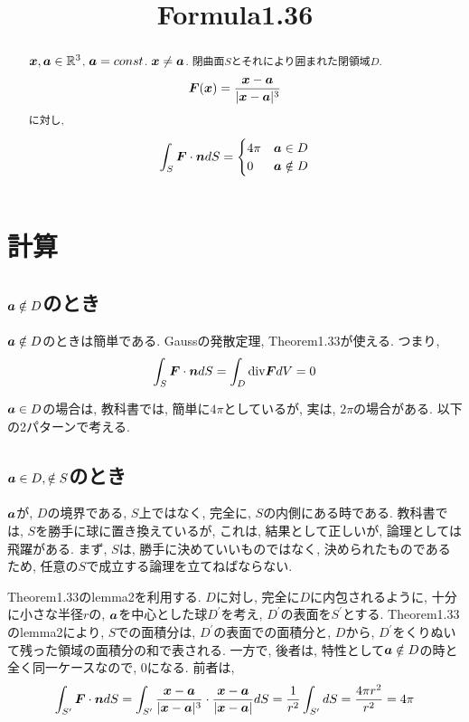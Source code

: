 \documentclass{jsarticle}
\title{Formula1.36}
\newcommand*{\mbold}[1]{\mbox{\boldmath $#1$}}
\newcommand*{\divg}{{\rm div}}
\begin{document}
\maketitle

\begin{abstract}
  $\mbold{x}, \mbold{a} \in \mathbb{R}^3$, $\mbold{a} = const$. $\mbold{x} \neq \mbold{a}$.
  閉曲面$S$とそれにより囲まれた閉領域$D$.
  \begin{equation*}
    \mbold{F}(\mbold{x}) = \frac{\mbold{x} - \mbold{a}}{|\mbold{x} - \mbold{a}|^3}
  \end{equation*}
  に対し, 
  
  \begin{equation}
    \int_S \mbold{F}\cdot\mbold{n}dS = 
    \begin{cases}
      4\pi & \mbold{a} \in D \\
      0    & \mbold{a} \notin D 
    \end{cases}
  \end{equation}


\end{abstract}

\section*{計算}
\subsection{$\mbold{a} \notin D$のとき}
$\mbold{a} \notin D$のときは簡単である. 
Gaussの発散定理, Theorem1.33が使える. つまり, 
\begin{equation}
  \int_S \mbold{F}\cdot\mbold{n}dS = \int_D \divg \mbold{F} dV = 0
\end{equation}

$\mbold{a} \in D$の場合は, 教科書では, 簡単に$4\pi$としているが, 
実は, $2\pi$の場合がある. 
以下の2パターンで考える. 

\subsection{$\mbold{a} \in D, \notin S$のとき}
$\mbold{a}$が, $D$の境界である, $S$上ではなく, 完全に, $S$の内側にある時である. 
教科書では, $S$を勝手に球に置き換えているが, これは, 結果として正しいが, 論理としては飛躍がある. 
まず, $S$は, 勝手に決めていいものではなく, 決められたものであるため, 任意の$S$で成立する論理を立てねばならない. 

Theorem1.33のlemma2を利用する. $D$に対し, 完全に$D$に内包されるように, 十分に小さな半径$r$の, $\mbold{a}$を中心とした球$D^\prime$を考え, 
$D^\prime$の表面を$S^\prime$とする. 
Theorem1.33のlemma2により, $S$での面積分は, $D^\prime$の表面での面積分と, $D$から, $D^\prime$をくりぬいて残った領域の面積分の和で表される. 
一方で, 後者は, 特性として$\mbold{a} \notin D$の時と全く同一ケースなので, $0$になる. 
前者は, 
\begin{equation}
  \int_{S^\prime} \mbold{F}\cdot \mbold{n}dS
  = \int_{S^\prime} \frac{\mbold{x} - \mbold{a}}{|\mbold{x} - \mbold{a}|^3} \cdot \frac{\mbold{x} - \mbold{a}}{|\mbold{x} - \mbold{a}|}dS 
  = \frac{1}{r^2}\int_{S^\prime} dS = \frac{4\pi r^2}{r^2} = 4\pi
\end{equation}
\end{document}
